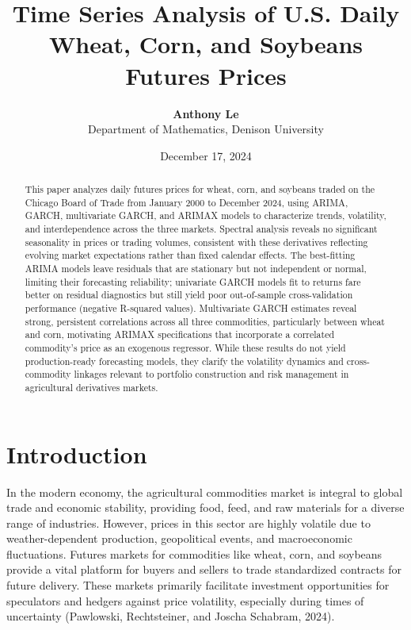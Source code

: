 \documentclass[11pt]{article}
\title{\textbf{Time Series Analysis of U.S. Daily \\ Wheat, Corn, and Soybeans Futures Prices}}
\author{\textbf{Anthony Le} \\[0.3em] \normalsize Department of Mathematics, Denison University}
\date{December 17, 2024}
\begin{document}
\maketitle

\begin{abstract}
\noindent This paper analyzes daily futures prices for wheat, corn, and soybeans traded on the Chicago Board of Trade from January 2000 to December 2024, using ARIMA, GARCH, multivariate GARCH, and ARIMAX models to characterize trends, volatility, and interdependence across the three markets. Spectral analysis reveals no significant seasonality in prices or trading volumes, consistent with these derivatives reflecting evolving market expectations rather than fixed calendar effects. The best-fitting ARIMA models leave residuals that are stationary but not independent or normal, limiting their forecasting reliability; univariate GARCH models fit to returns fare better on residual diagnostics but still yield poor out-of-sample cross-validation performance (negative R-squared values). Multivariate GARCH estimates reveal strong, persistent correlations across all three commodities, particularly between wheat and corn, motivating ARIMAX specifications that incorporate a correlated commodity's price as an exogenous regressor. While these results do not yield production-ready forecasting models, they clarify the volatility dynamics and cross-commodity linkages relevant to portfolio construction and risk management in agricultural derivatives markets.
\end{abstract}

\section{Introduction}

In the modern economy, the agricultural commodities market is integral to global trade and economic stability, providing food, feed, and raw materials for a diverse range of industries. However, prices in this sector are highly volatile due to weather-dependent production, geopolitical events, and macroeconomic fluctuations. Futures markets for commodities like wheat, corn, and soybeans provide a vital platform for buyers and sellers to trade standardized contracts for future delivery. These markets primarily facilitate investment opportunities for speculators and hedgers against price volatility, especially during times of uncertainty (Pawlowski, Rechtsteiner, and Joscha Schabram, 2024).
\end{document}
